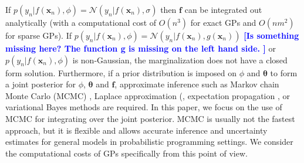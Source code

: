 \documentclass[onecolumn,a4paper,11pt]{article}
\newcommand{\todo}[1]{\textcolor{blue}{\textbf{[#1]}}}
\begin{document}

 

If $p(y_n|f(\bm{x}_n),\phi)=\mathcal{N}(y_n|f(\bm{x}_n),\sigma)$ then $\bm{f}$ can be integrated out analytically (with a computational cost of $O(n^3)$ for exact GPs and $O(nm^2)$ for sparse GPs). If $p(y_n|f(\bm{x}_n),\phi)=\mathcal{N}(y_n|f(\bm{x}_n),g(\bm{x}_n))$ \todo{Is something missing here? The function g is missing on the left hand side. } or $p(y_n|f(\bm{x}_n),\phi)$ is non-Gaussian, the marginalization does not have a closed form solution. Furthermore, if a prior distribution is imposed on $\phi$ and $\bm{\theta}$ to form a joint posterior for $\phi$, $\bm{\theta}$ and $\bm{f}$, approximate inference such as Markov chain Monte Carlo (MCMC) \citep{brooks_2011}, Laplace approximation (\citep{williams1998bayesian,rasmussen2006gaussian}, expectation propagation \citep{minka2001expectation}, or variational Bayes methods \citep{gibbs2000variational,csato2000efficient} are required. In this paper, we focus on the use of MCMC for integrating over the joint
posterior. MCMC is usually not the fastest approach, but it is flexible and allows
accurate inference and uncertainty estimates for general models in probabilistic programming
settings. We consider the computational costs of GPs specifically from
this point of view.
\end{document}
